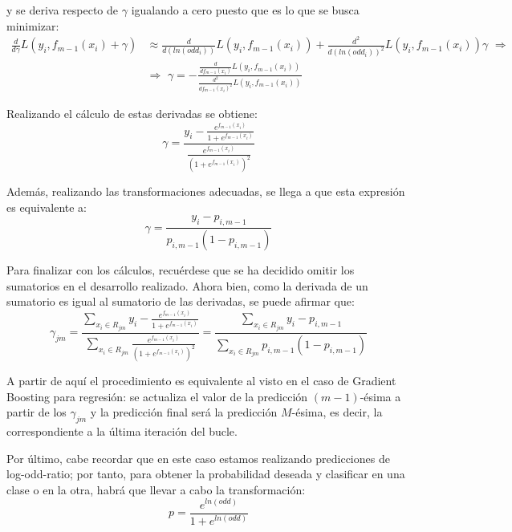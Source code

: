 \documentclass[12pt,twoside]{article}
\begin{document}
\noindent
y se deriva respecto de $\gamma$ igualando a cero puesto que es lo que se busca minimizar:
\begin{equation*}
\begin{split}
\frac{d}{d\gamma}L(y_i, f_{m-1}(x_i) + \gamma) &\approx \frac{d}{d(ln(odd_i))}L(y_i, f_{m-1}(x_i)) + \frac{d^2}{d(ln(odd_i))^2}L(y_i, f_{m-1}(x_i))\gamma \, \, \Rightarrow \\
& \Rightarrow \, \, \gamma = - \frac{\frac{d}{df_{m-1}(x_i)}L(y_i, f_{m-1}(x_i))}{\frac{d^2}{df_{m-1}(x_i)^2}L(y_i, f_{m-1}(x_i))}
\end{split}
\end{equation*}

Realizando el cálculo de estas derivadas se obtiene:
\begin{equation}
\label{eqn:3}
\gamma = \frac{y_i - \frac{e^{f_{m-1}(x_i)}}{1 + e^{f_{m-1}(x_i)}}}{\frac{e^{f_{m-1}(x_i)}}{(1 + e^{f_{m-1}(x_i)})^2}}
\end{equation}

Además, realizando las transformaciones adecuadas, se llega a que esta expresión es equivalente a:
\begin{equation}
\label{eqn:4}
\gamma = \frac{y_i - p_{i, m-1}}{p_{i, m-1}(1 - p_{i, m-1})}
\end{equation}

Para finalizar con los cálculos, recuérdese que se ha decidido omitir los sumatorios en el desarrollo realizado. Ahora bien, como la derivada de un sumatorio es igual al sumatorio de las derivadas, se puede afirmar que:
\begin{equation*}
\gamma_{jm} = \frac{\displaystyle \sum_{x_i \in R_{jm}} y_i - \frac{e^{f_{m-1}(x_i)}}{1 + e^{f_{m-1}(x_i)}}}{\displaystyle \sum_{x_i \in R_{jm}} \frac{e^{f_{m-1}(x_i)}}{(1 + e^{f_{m-1}(x_i)})^2}} = \frac{\displaystyle \sum_{x_i \in R_{jm}} y_i - p_{i, m-1}}{\displaystyle \sum_{x_i \in R_{jm}} p_{i, m-1}(1 - p_{i, m-1})}
\end{equation*}

A partir de aquí el procedimiento es equivalente al visto en el caso de Gradient Boosting para regresión: se actualiza el valor de la predicción $(m-1)$-ésima a partir de los $\gamma_{jm}$ y la predicción final será la predicción $M$-ésima, es decir, la correspondiente a la última iteración del bucle.

Por último, cabe recordar que en este caso estamos realizando predicciones de log-odd-ratio; por tanto, para obtener la probabilidad deseada y clasificar en una clase o en la otra, habrá que llevar a cabo la transformación:
\begin{equation*}
p = \frac{e^{ln(odd)}}{1 + e^{ln(odd)}}
\end{equation*}
\end{document}
